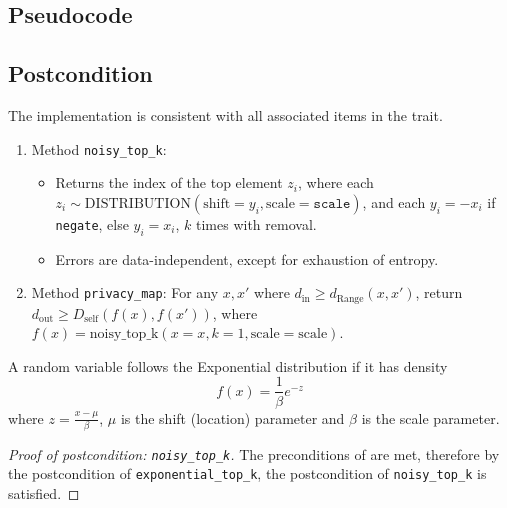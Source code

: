 \documentclass{article}
\begin{document}
\subsection*{Pseudocode}
\label{sec:python-pseudocode}


\subsection*{Postcondition}
\begin{theorem}
    The implementation is consistent with all associated items in the  trait.
    \begin{enumerate}
        \item Method \texttt{noisy\_top\_k}:
        \begin{itemize}
            \item Returns the index of the top element $z_i$,
            where each $z_i \sim \mathrm{DISTRIBUTION}(\mathrm{shift}=y_i, \mathrm{scale}=\texttt{scale})$,
            and each $y_i = -x_i$ if \texttt{negate}, else $y_i = x_i$,
            $k$ times with removal.
            \item Errors are data-independent, except for exhaustion of entropy.
        \end{itemize}
        \item Method \texttt{privacy\_map}:
        For any $x, x'$ where $d_\mathrm{in} \ge d_\mathrm{Range}(x, x')$,
        return $d_\mathrm{out} \ge D_\mathrm{self}(f(x), f(x'))$,
        where $f(x) = \mathrm{noisy\_top\_k}(x=x, k=1, \mathrm{scale}=\mathrm{scale})$.
    \end{enumerate}
\end{theorem}


\begin{definition}
    \label{def:Exponential}
    A random variable follows the Exponential distribution if it has density
    \begin{equation}
        f(x) = \frac{1}{\beta} e^{-z}
    \end{equation}
    where $z = \frac{x - \mu}{\beta}$,
    $\mu$ is the shift (location) parameter and $\beta$ is the scale parameter.
\end{definition}

\begin{proof}[Proof of postcondition: \texttt{noisy\_top\_k}]
    The preconditions of  are met,
    therefore by the postcondition of \texttt{exponential\_top\_k},
    the postcondition of \texttt{noisy\_top\_k} is satisfied.
\end{proof}
\end{document}
